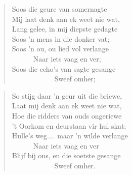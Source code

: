 \begin{verse}
Soos die geure van somernagte \\ 
Mij laat denk aan ek weet nie wat, \\ 
Lang gelee, in mij diepste gedagte \\ 
Soos ’n mens in die donker vat; \\ 
Soos ’n ou, ou lied vol verlange \\ 
\ \ \ \ \ \ Naar iets vaag en ver; \\ 
Soos die echo’s van sagte gesange \\ 
\ \ \ \ \ \ \ \ \ \ \ \ Sweef omher; \\ 
\end{verse}

\begin{verse}
So stijg daar ’n geur uit die briewe, \\ 
Laat mij denk aan ek weet nie wat, \\ 
Hoe die ridders van ouds ongeriewe \\ 
’t Oorkom en deurstaan vir hul skat; \\ 
Hulle’s weg.... maar ’n wilde verlange \\ 
\ \ \ \ \ \ Naar iets vaag en ver \\ 
Blijf bij ons, en die soetste gesange \\ 
\ \ \ \ \ \ \ \ \ \ \ \ Sweef omher. \\ 
\end{verse}
